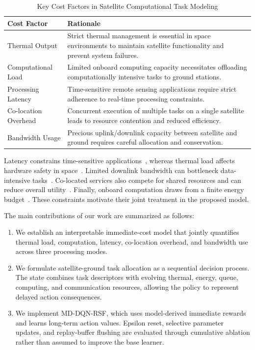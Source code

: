 \documentclass[lettersize,journal]{IEEEtran}
\begin{document}
\begin{table}
\begin{center}
\caption{Key Cost Factors in Satellite Computational Task Modeling}
\label{tab:cost_factors}
\begin{tabular}{p{2cm} p{4cm}}
\hline
\textbf{Cost Factor} & \textbf{Rationale} \\
\hline
Thermal Output & Strict thermal management is essential in space environments to maintain satellite functionality and prevent system failures. \\
\hline
Computational Load & Limited onboard computing capacity necessitates offloading computationally intensive tasks to ground stations. \\
\hline
Processing Latency & Time-sensitive remote sensing applications require strict adherence to real-time processing constraints. \\
\hline
Co-location Overhead & Concurrent execution of multiple tasks on a single satellite leads to resource contention and reduced efficiency. \\
\hline
Bandwidth Usage & Precious uplink/downlink capacity between satellite and ground requires careful allocation and conservation. \\
\hline
\end{tabular}
\end{center}
\end{table}

Latency constrains time-sensitive applications~\cite{abdulkarim2025multi}, whereas thermal load affects hardware safety in space~\cite{karkadakattil2025ai}. Limited downlink bandwidth can bottleneck data-intensive tasks~\cite{zhang2024dynamic}. Co-located services also compete for shared resources and can reduce overall utility~\cite{10589437}. Finally, onboard computation draws from a finite energy budget~\cite{10589437}. These constraints motivate their joint treatment in the proposed model.


The main contributions of our work are summarized as follows:
\begin{enumerate}
    \item We establish an interpretable immediate-cost model that jointly quantifies thermal load, computation, latency, co-location overhead, and bandwidth use across three processing modes.

    \item We formulate satellite-ground task allocation as a sequential decision process. The state combines task descriptors with evolving thermal, energy, queue, computing, and communication resources, allowing the policy to represent delayed action consequences.

    \item We implement MD-DQN-RSF, which uses model-derived immediate rewards and learns long-term action values. Epsilon reset, selective parameter updates, and replay-buffer flushing are evaluated through cumulative ablation rather than assumed to improve the base learner.

\end{enumerate}
\end{document}
